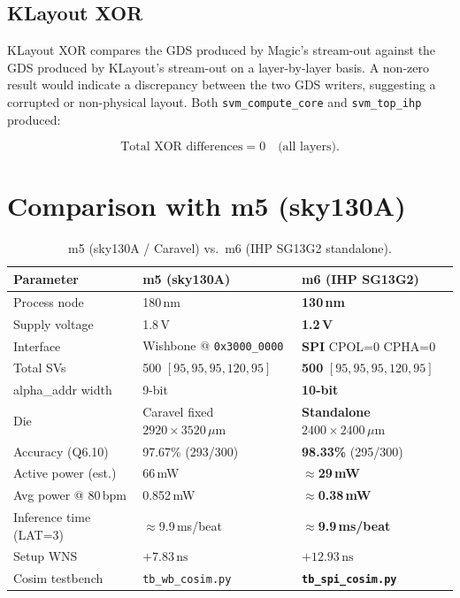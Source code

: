 \documentclass[11pt]{article}
\newcommand{\um}{\,\mu\mathrm{m}}
\begin{document}
\subsection{KLayout XOR}

KLayout XOR compares the GDS produced by Magic's stream-out against the GDS
produced by KLayout's stream-out on a layer-by-layer basis.  A non-zero result
would indicate a discrepancy between the two GDS writers, suggesting a corrupted
or non-physical layout.  Both \texttt{svm\_compute\_core} and
\texttt{svm\_top\_ihp} produced:

\begin{equation*}
  \text{Total XOR differences} = 0 \quad \text{(all layers)}.
\end{equation*}

\section{Comparison with m5 (sky130A)}

\begin{table}[H]
  \centering
  \caption{m5 (sky130A / Caravel) vs.\ m6 (IHP SG13G2 standalone).}
  \label{tab:delta}
  \small
  \begin{tabular}{lll}
    \toprule
    Parameter & m5 (sky130A) & m6 (IHP SG13G2) \\
    \midrule
    Process node & 180\,nm & \textbf{130\,nm} \\
    Supply voltage & 1.8\,V & \textbf{1.2\,V} \\
    Interface & Wishbone @ \texttt{0x3000\_0000} & \textbf{SPI} CPOL=0 CPHA=0 \\
    Total SVs & 500 $[95,95,95,120,95]$ & \textbf{500} $[95,95,95,120,95]$ \\
    alpha\_addr width & 9-bit & \textbf{10-bit} \\
    Die & Caravel fixed $2920\times3520\um$ & \textbf{Standalone} $2400\times2400\um$ \\
    Accuracy (Q6.10) & 97.67\% (293/300) & \textbf{98.33\%} (295/300) \\
    Active power (est.) & 66\,mW & \textbf{$\approx$29\,mW} \\
    Avg power @ 80\,bpm & 0.852\,mW & \textbf{$\approx$0.38\,mW} \\
    Inference time (LAT=3) & $\approx$9.9\,ms/beat & \textbf{$\approx$9.9\,ms/beat} \\
    Setup WNS & $+7.83\,\mathrm{ns}$ & $+12.93\,\mathrm{ns}$ \\
    Cosim testbench & \texttt{tb\_wb\_cosim.py} & \textbf{\texttt{tb\_spi\_cosim.py}} \\
    \bottomrule
  \end{tabular}
\end{table}
\end{document}
